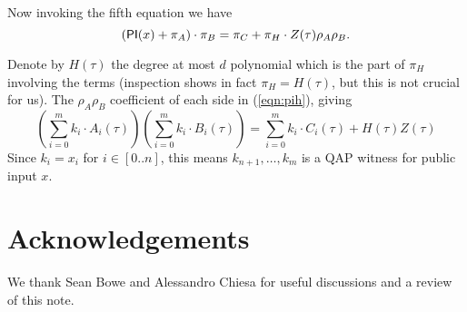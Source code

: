 \documentclass[11pt]{article}
\numberwithin{figure}{section} %
\begin{document}
Now invoking the fifth equation we have
\begin{equation}\label{eqn:pih}
(\mathsf{PI}(x)+\pi_A)\cdot \pi_B= \pi_C + \pi_H\cdot Z(\tau)\rho_A\rho_B. 
\end{equation}


Denote by $H(\tau)$ the degree at most $d$ polynomial which is the part of $\pi_H$ involving the terms
 (inspection shows in fact $\pi_H=H(\tau)$, but this is not crucial for us).
The $\rho_A\rho_B$ coefficient of each side in (\ref{eqn:pih}), giving
\[\left(\sum_{i=0}^m k_i \cdot A_i(\tau)\right)\left(\sum_{i=0}^m k_i\cdot  B_i(\tau)\right) = \sum_{i=0}^m k_i\cdot C_i(\tau) + H(\tau)Z(\tau)\]
Since $k_i=x_i$ for $i\in [0..n]$, this means $k_{n+1},\ldots,k_m$ is a QAP witness for public input $x$.

\section*{Acknowledgements}
We thank Sean Bowe and Alessandro Chiesa for useful discussions and a review of this note.


\end{document}
